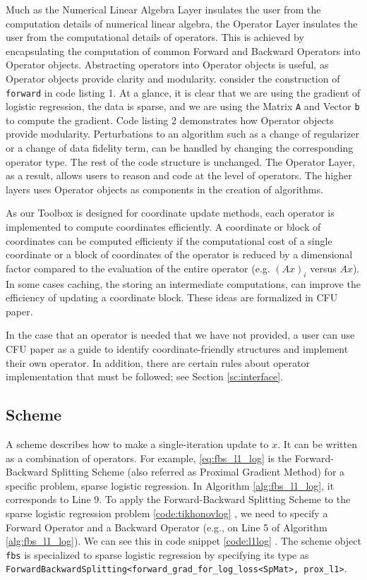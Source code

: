 Much as the Numerical Linear Algebra Layer insulates the user from the computation details of numerical linear algebra, the Operator Layer insulates the user from the computational details of operators. This is achieved by encapsulating the computation of common Forward and Backward Operators into Operator objects. Abstracting operators into Operator objects is useful, as Operator objects provide clarity and modularity. consider the construction of  \texttt{forward} in code listing 1. At a glance, it is clear that we are using the gradient of logistic regression, the data is sparse, and we are using the Matrix \texttt{A} and Vector \texttt{b} to compute the gradient. Code listing 2 demonstrates how Operator objects provide modularity. Perturbations to an algorithm such as a change of regularizer or a change of data fidelity term, can be handled by changing the corresponding operator type. The rest of the code structure is unchanged. The Operator Layer, as a result, allows users to reason and code at the level of operators. 
The higher layers uses Operator objects as components in the creation of algorithms.
 
As our Toolbox is designed for coordinate update methods, each operator is implemented to compute coordinates efficiently.
 A coordinate or block of coordinates can be computed efficienty if the computational cost of a single coordinate or a block of coordinates of the operator is reduced by a dimensional factor compared to the evaluation of the entire operator (e.g. $(Ax)_i$ versus $Ax$). 
 In some cases caching, the storing an intermediate computations, can improve the efficiency of updating a coordinate block. These ideas are formalized in CFU paper.

In the case that an operator is needed that we have not provided, a user can use CFU paper as a guide to identify coordinate-friendly structures and implement their own operator. In addition, there are certain rules about operator implementation that must be followed; see Section \ref{sc:interface}.


\subsection{Scheme}
A scheme describes how to make a single-iteration update to $x$.
It can be written as a combination of operators. For example, \eqref{eq:fbs_l1_log} is the Forward-Backward Splitting Scheme (also referred as Proximal Gradient Method) for a specific problem, sparse logistic regression. In Algorithm \ref{alg:fbs_l1_log}, it corresponds to Line 9. To apply the Forward-Backward Splitting Scheme to the sparse logistic regression problem \ref{code:tikhonovlog} , we need to specify a Forward Operator and a Backward Operator (e.g., on Line 5 of Algorithm \ref{alg:fbs_l1_log}). We can see this in code snippet \ref{code:l1log} .
The scheme object \texttt{fbs} is specialized to sparse logistic regression by specifying its type as \texttt{ForwardBackwardSplitting<forward\_grad\_for\_log\_loss<SpMat>, prox\_l1>}.

